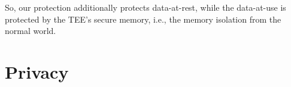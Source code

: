 So, our protection additionally protects data-at-rest, while the data-at-use is protected by the TEE's secure memory, i.e., the memory isolation from the normal world.



\section{Privacy}


